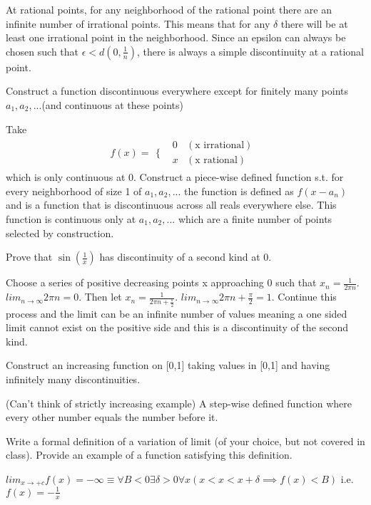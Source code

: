 \documentclass[12pt]{article}
\newenvironment{exercise}[2][Exercise]{\begin{trivlist}
\item[\hskip \labelsep {\bfseries #1}\hskip \labelsep {\bfseries #2.}]}{\end{trivlist}}
\begin{document}
At rational points, for any neighborhood of the rational point there are an infinite number of irrational points. This means that for any $\delta$ there will be at least one irrational point in the neighborhood. Since an epsilon can always be chosen such that $\epsilon < d(0, \frac{1}{n})$, there is always a simple discontinuity at a rational point.

\begin{exercise}{2.1}
Construct a function discontinuous everywhere except for finitely many points $a_1, a_2,...$(and continuous at these points)
\end{exercise}
Take $$f(x)=\begin{array}{cc}
  \{ & 
    \begin{array}{cc}
      0 & (\text{x irrational})\\
      x & (\text{x rational})
    \end{array}
\end{array}$$
which is only continuous at 0. Construct a piece-wise defined function s.t. for every neighborhood of size 1 of $a_1, a_2,...$ the function is defined as $f(x-a_n)$ and is a function that is discontinuous across all reals everywhere else. This function is continuous only at $a_1, a_2,...$ which are a finite number of points selected by construction.

\begin{exercise}{2.2}
Prove that $\sin(\frac{1}{x})$ has discontinuity of a second kind at 0.
\end{exercise}
Choose a series of positive decreasing points x approaching 0 such that $x_n = \frac{1}{2\pi n}$. $lim_{n\rightarrow\infty}2\pi n = 0$. Then let $x_n = \frac{1}{2\pi n+\frac{\pi}{2}}$. $lim_{n\rightarrow\infty}2\pi n+\frac{\pi}{2} = 1$. Continue this process and the limit can be an infinite number of values meaning a one sided limit cannot exist on the positive side and this is a discontinuity of the second kind.
\begin{exercise}{2.3}
Construct an increasing function on [0,1] taking values in [0,1] and having infinitely many discontinuities.
\end{exercise}
(Can't think of strictly increasing example) A step-wise defined function where every other number equals the number before it.

\begin{exercise}{2.4}
Write a formal definition of a variation of limit (of your choice, but not covered in class). Provide an example of a function satisfying this definition. 
\end{exercise}

$lim_{x\rightarrow+c}f(x)=-\infty \equiv \forall B<0 \exists \delta > 0\forall x (x<x<x+\delta \implies f(x) < B)$ i.e. $f(x)=-\frac{1}{x}$
 
\end{document}
